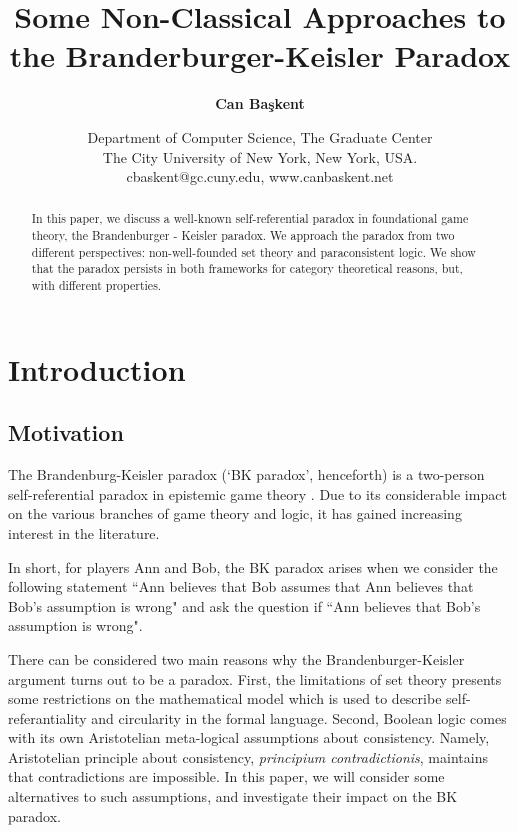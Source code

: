 \documentclass{article}
\begin{document}
\renewcommand{\qedsymbol}{$\blacksquare$}
\newtheorem{thm}{Theorem} [section]     
\newtheorem{cor}[thm]{Corollary} 
\newtheorem{lem}[thm]{Lemma} 
\newtheorem{prop}[thm]{Proposition} 
\newtheorem{rem}[thm]{Remark}

\theoremstyle{definition}
\newtheorem{dfn}[thm]{Definition}
\newtheorem{ex}[thm]{Example}

\title{Some Non-Classical Approaches to the Branderburger-Keisler Paradox}
\author{\textbf{Can Ba\c{s}kent}}
\date{\small{Department of Computer Science, The Graduate Center \\ The City University of New York, New York, USA. \\ \textsf{cbaskent@gc.cuny.edu}, \textsf{www.canbaskent.net}}}
\maketitle
\begin{abstract}
In this paper, we discuss a well-known self-referential paradox in foundational game theory, the Brandenburger - Keisler paradox. We approach the paradox from two different perspectives: non-well-founded set theory and paraconsistent logic. We show that the paradox persists in both frameworks for category theoretical reasons, but, with different properties.
\end{abstract}

\section{Introduction}

\subsection{Motivation} 
The Brandenburg-Keisler paradox (`BK paradox', henceforth) is a two-person self-referential paradox in epistemic game theory \cite{bran0}. Due to its considerable impact on the various branches of game theory and logic, it has gained increasing interest in the literature.

In short, for players Ann and Bob, the BK paradox arises when we consider the following statement  ``Ann believes that Bob assumes that Ann believes that Bob's assumption is wrong" and ask the question if ``Ann believes that Bob's assumption is wrong".

There can be considered two main reasons why the Brandenburger-Keisler argument turns out to be a  paradox. First, the limitations of set theory presents some restrictions on the mathematical model which is used to describe self-referantiality and circularity in the formal language. Second, Boolean logic comes with its own Aristotelian meta-logical assumptions about consistency. Namely, Aristotelian principle about consistency, \emph{principium contradictionis}, maintains that contradictions are impossible. In this paper, we will consider some alternatives to such assumptions, and investigate their impact on the BK paradox.
\end{document}
